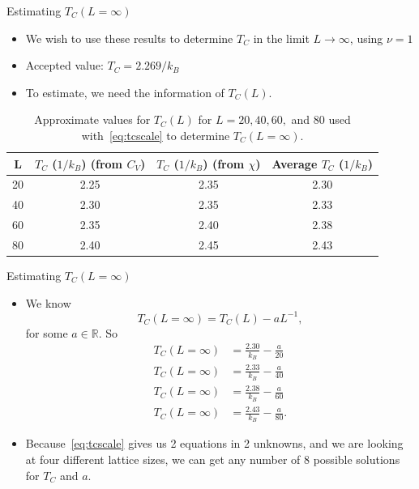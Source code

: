 \documentclass{beamer} %
\begin{document}
\begin{frame}{Estimating $T_{C}\left(L=\infty\right)$}
\begin{itemize}
\item We wish to use these results to determine $T_{C}$ in the limit $L\rightarrow\infty$, using $\nu=1$
\item Accepted value: $T_{C}=2.269/k_{B}$~\cite{lecture}
\item To estimate, we need the information of $T_{C}(L)$. 
\end{itemize} 

\begin{table}[ht]
\begin{center}
\begin{tabular}{c|c|c|c} \hline
L & $T_{C}$ ($1/k_{B}$) (from $C_{V}$) & $T_{C}$ ($1/k_{B}$) (from $\chi$) & Average $T_{C}$ ($1/k_{B}$)\\ \hline
20 & 2.25 & 2.35 & 2.30 \\
40 & 2.30 & 2.35 & 2.33 \\
60 & 2.35 & 2.40 & 2.38 \\
80 & 2.40 & 2.45 & 2.43\\ \hline
\end{tabular}
\caption{Approximate values for $T_{C}(L)$ for $L=20, 40, 60,$ and 80 used with~\eqref{eq:tcscale} to determine $T_{C}(L=\infty)$.}
\label{tab:tcl}
\end{center}
\end{table}
\end{frame}

\begin{frame}{Estimating $T_{C}\left(L=\infty\right)$}
\begin{itemize}
\item We know 
$$
T_{C}(L=\infty)=T_{C}(L)-aL^{-1},
$$
for some $a\in\mathbb{R}$.  So
\begin{align*}
T_{C}(L=\infty) & = \frac{2.30}{k_{B}}-\frac{a}{20} \\
T_{C}(L=\infty) & = \frac{2.33}{k_{B}}-\frac{a}{40} \\
T_{C}(L=\infty) & = \frac{2.38}{k_{B}}-\frac{a}{60} \\
T_{C}(L=\infty) & = \frac{2.43}{k_{B}}-\frac{a}{80}.
\end{align*}
\item Because~\eqref{eq:tcscale} gives us 2 equations in 2 unknowns, and we are looking at four different lattice sizes, we can get any number of 8 possible solutions for $T_{C}$ and $a$.  
\end{itemize}
\end{frame}
\end{document}
